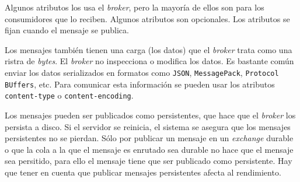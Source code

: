 Algunos atributos los usa el \emph{broker}, pero la mayoría de ellos son para
los consumidores que lo reciben. Algunos atributos
son opcionales. Los atributos se fijan cuando el mensaje se publica.

Los mensajes también tienen una carga (los datos) que el \emph{broker} trata
como una ristra de \emph{bytes}. El \emph{broker} no inspecciona o modifica
los datos. Es bastante común enviar los datos serializados en formatos como
\texttt{JSON}, \texttt{MessagePack}, \texttt{Protocol BUffers}, etc. Para comunicar
esta información se pueden usar los atributos \texttt{content-type} o \texttt{content-encoding}.

Los mensajes pueden ser publicados como persistentes, que hace que el \emph{broker}
los persista a disco. Si el servidor se reinicia, el sistema se asegura que los
mensajes persistentes no se pierdan. Sólo por publicar un mensaje en un \emph{exchange}
durable o que la cola a la que el mensaje es enrutado sea durable no hace que el
mensaje sea persitido, para ello el mensaje tiene que ser publicado como persistente.
Hay que tener en cuenta que publicar mensajes persistentes afecta al rendimiento.
